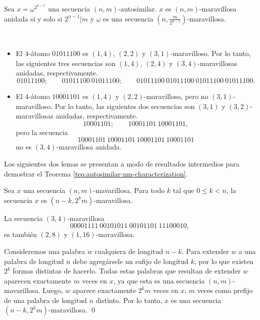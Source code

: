 \documentclass[11pt]{article}
\begin{document}
\begin{teo}
	\label{teo:autosimilar-nm-characterization}
	Sea $x = \omega^{2^{n-1}}$ una secuencia $(n,m)$-autosimilar.
	$x$ es $(n,m)$-maravillosa anidada si y solo si $2^{n-1} \vert m$ y
	$\omega$
	es una secuencia $\left( n, \frac{m}{2^{n-1}} \right)$-maravillosa.
\end{teo}

\begin{examples}\ %
	\begin{itemize}
		\item El $4$-átomo $01011100$ es $(1,4)$, $(2,2)$ y
		      $(3,1)$-maravilloso.
		      Por lo tanto, las siguientes tres secuencias son $(1,4)$, $(2,4)$ y
		      $(3,4)$-maravillosas anidadas, respectivamente.
		      \[ 01011100; \qquad 01011100\ 01011100; \qquad 01011100\
			      01011100\ 01011100\ 01011100.
		      \]
		\item El $4$-átomo $10001101$ es $(1,4)$ y $(2,2)$-maravilloso,
		      pero no $(3,1)$-maravilloso.
		      Por lo tanto, las siguientes dos secuencias son $(3,1)$ y $(3,2)$-maravillosas
		      anidadas, respectivamente.
		      \[ 10001101; \qquad 10001101\ 10001101,
		      \]
		      pero la secuencia
		      \[ 10001101\ 10001101\ 10001101\
			      10001101 \]
		      no es $(3,4)$-maravillosa anidada.
	\end{itemize}
\end{examples}

Los siguientes dos lemas se presentan a modo de resultados intermedios para
demostrar el Teorema \ref{teo:autosimilar-nm-characterization}.

\begin{lema} \label{lemma:marvellous-for-smaller-n}
	Sea $x$ una secuencia $(n,m)$-mavarillosa.
	Para todo $k$ tal que $0 \leq k < n$, la secuencia $x$ es $(n - k,2^{k}
		m)$-maravillosa.
\end{lema}

\begin{example}
	La secuencia $(3,4)$-maravillosa \[ 00001111\ 00101011\ 00101101\ 11100010, \]
	es también $(2,8)$ y $(1,16)$-maravillosa.
\end{example}

\begin{demo}
	Consideremos una palabra $w$ cualquiera de longitud $n - k$.
	Para extender $w$ a una palabra de longitud $n$ debe agregársele un sufijo de
	longitud $k$, por lo que existen $2^{k}$ formas distintas de hacerlo.
	Todas estas palabras que resultan de extender $w$ aparecen exactamente $m$
	veces en $x$, ya que esta es una secuencia $(n,m)$-mavarillosa.
	Luego, $w$ aparece exactamente $2^{k}m$ veces en $x$, $m$ veces como prefijo de
	una palabra de longitud $n$ distinto.
	Por lo tanto, $x$ es una secuencia $(n - k,2^{k}m)$-maravillosa.
	\qed
\end{demo}
\end{document}
